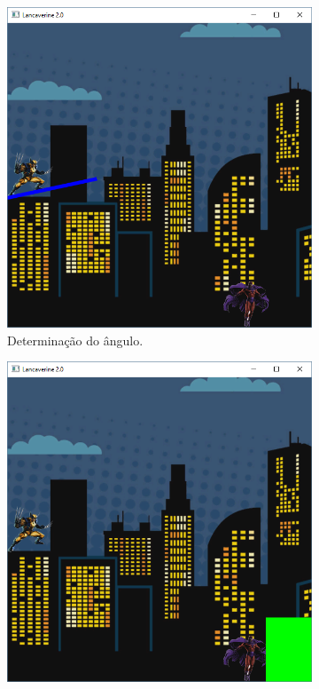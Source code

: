 \begin{renumerate}
   \begin{figure}[H]
    \centering
    \begin{subfigure}[t]{0.25\textwidth}
        \centerline{\includegraphics[width=.9\textwidth]{img/cap3_ex27}}
        \caption{Determinação do ângulo.}
        \label{fig:cap03_ex27a}
    \end{subfigure}
    \hfill
    \begin{subfigure}[t]{0.25\textwidth}
        \centerline{\includegraphics[width=.9\textwidth]{img/cap3_ex27b}}

\end{subfigure}
\end{figure}
\end{renumerate}
